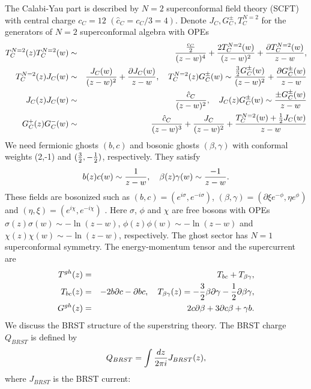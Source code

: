 \documentclass[a4paper,12pt]{article}
\begin{document}
The Calabi-Yau part is described by $N=2$ superconformal field theory (SCFT)
with central charge $c_{C}=12$ $(\hat{c}_{C}=c_{C}/3=4)$.
Denote $J_{C},G^{\pm}_{C},T^{N=2}_{C}$ for the generators of $N=2$
superconformal algebra with OPEs
\begin{eqnarray}
T^{N=2}_{C}(z)T^{N=2}_{C}(w)
&\sim&{{c_{C}\over2}\over(z-w)^4}+{2 T^{N=2}_{C}(w)\over (z-w)^2}
+{\partial T^{N=2}_{C}(w)\over z-w},\nonumber\\
T^{N=2}_{C}(z)J_{C}(w)&\sim&{J_{C}(w)\over (z-w)^2}
+{\partial J_{C}(w)\over z-w},
\quad
T^{N=2}_{C}(z)G^{\pm}_{C}(w)\sim{{3\over2}G^{\pm}_{C}(w)\over (z-w)^2}
+{\partial G^{\pm}_{C}(w)\over z-w}
\nonumber\\
 J_{C}(z)J_{C}(w)&\sim&{\hat{c}_{C}\over (z-w)^2},
\quad 
J_{C}(z)G^{\pm}_{C}(w)\sim{\pm G^{\pm}_{C}(w)\over z-w}
\nonumber\\
G^{+}_{C}(z)G^{-}_{C}(w)
&\sim& {\hat{c}_{C}\over (z-w)^3}
+{J_{C}\over (z-w)^2}+{T^{N=2}_{C}(w)+{1\over2}J_{C}(w)\over z-w}
\end{eqnarray}
We need fermionic ghosts $(b,c)$ and bosonic ghosts $(\beta,\gamma)$
with conformal weights (2,-1) and $({3\over2},-{1\over2})$,
respectively. They satisfy
\begin{equation}
 b(z)c(w)\sim{1\over z-w},\quad \beta(z)\gamma(w)\sim{-1\over z-w}.
\end{equation}
These fields are bosonized such as
$(b,c)=(e^{i\sigma},e^{-i\sigma})$,
$(\beta,\gamma)=(\partial\xi e^{-\phi},\eta e^{\phi})$ and
$(\eta,\xi)=(e^{i\chi},e^{-i\chi})$ \cite{FMS}.
Here $\sigma$, $\phi$ and $\chi$ are free bosons with OPEs
$\sigma(z)\sigma(w)\sim -\ln(z-w)$, $\phi(z)\phi(w)\sim -\ln(z-w)$
and $\chi(z)\chi(w)\sim -\ln(z-w)$, respectively.
The ghost sector has $N=1$ superconformal symmetry.
The energy-momentum tensor and the supercurrent are 
\begin{eqnarray}
T^{gh}(z)&=& T_{bc}+T_{\beta\gamma}, \nonumber\\
T_{bc}(z)&=& -2 b\partial c-\partial b c, \quad 
T_{\beta\gamma}(z)=-{3\over2} \beta\partial \gamma
-{1\over2}\partial \beta\gamma, \nonumber\\
G^{gh}(z)&=& 2 c\partial\beta+3\partial c \beta+\gamma b.
\end{eqnarray}
We discuss the BRST structure of the superstring theory. The BRST charge
$Q_{BRST}$ is defined by
\begin{equation}
 Q_{BRST}=\int {d z\over2\pi i} J_{BRST}(z), 
\label{eq:brso}
\end{equation}
where $J_{BRST}$
is the BRST current:
\end{document}
